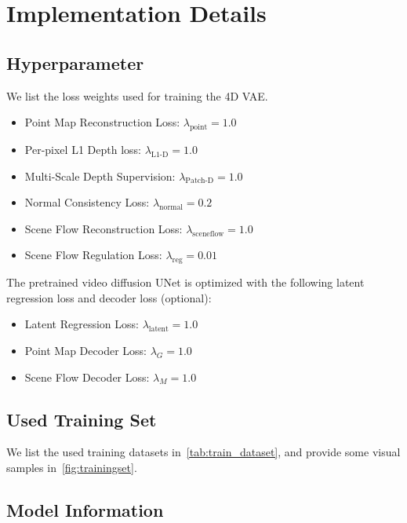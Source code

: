 

\section{Implementation Details}
\label{sec:more_details}

\subsection{Hyperparameter}

We list the loss weights used for training the 4D VAE. 
\begin{itemize}
    \item {Point Map Reconstruction Loss:} 
    $\lambda_{\text{point}} = 1.0$
    \item {Per-pixel L1 Depth loss:} 
    $\lambda_{\text{L1-D}} = 1.0$
    \item {Multi-Scale Depth Supervision:} 
    $\lambda_{\text{Patch-D}} = 1.0$
    \item {Normal Consistency Loss:}
    $\lambda_{\text{normal}} = 0.2$    
    \item {Scene Flow Reconstruction Loss:} 
    $\lambda_{\text{sceneflow}} = 1.0$
    \item {Scene Flow Regulation Loss:} 
    $\lambda_{\text{reg}} = 0.01$
\end{itemize}
% 
The pretrained video diffusion UNet is optimized with the following latent regression loss and decoder loss (optional):

\begin{itemize}
    \item {Latent Regression Loss:} 
    $\lambda_{\text{latent}} = 1.0$
    \item {Point Map Decoder Loss:} 
    $\lambda_{G} = 1.0$
    \item {Scene Flow Decoder Loss:} 
    $\lambda_{M} = 1.0$    
\end{itemize}


\subsection{Used Training Set}
We list the used training datasets in~\cref{tab:train_dataset}, and provide some visual samples in~\cref{fig:trainingset}.



\subsection{Model Information}

